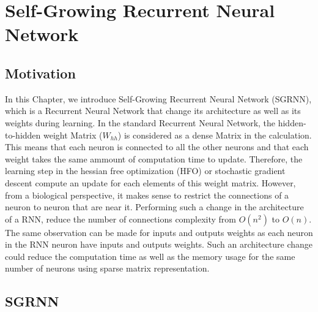 
\chapter{ Self-Growing Recurrent Neural Network} %

\label{Chapter 2} %




\section{Motivation}

In this Chapter, we introduce Self-Growing Recurrent Neural Network (SGRNN), which is a Recurrent Neural Network that change its architecture as well as its weights during learning. In the standard Recurrent Neural Network, the hidden-to-hidden weight Matrix ($W_{hh}$) is considered as a dense Matrix in the calculation. This means that each neuron is connected to all the other neurons and that each weight takes the same ammount of computation time to update. Therefore, the learning step in the hessian free optimization (HFO) or stochastic gradient descent compute an update for each elements of this weight matrix. However, from a biological perspective, it makes sense to restrict the connections of a neuron to neuron that are near it. Performing such a change in the architecture of a RNN, reduce the number of connections complexity from $O(n^2)$ to $O(n)$. The same observation can be made for inputs and outputs weights as each neuron in the RNN neuron have inputs and outputs weights. Such an architecture change could reduce the computation time as well as the memory usage for the same number of neurons using sparse matrix representation. 

\section{SGRNN}

